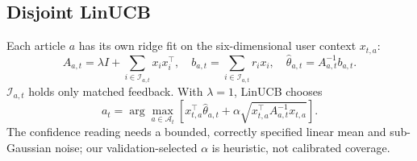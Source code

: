 \documentclass[10pt,a4paper]{article}
\begin{document}
\subsection{Disjoint LinUCB}
Each article $a$ has its own ridge fit on the six-dimensional user context
$x_{t,a}$:
\begin{equation}
A_{a,t}=\lambda I+\sum_{i\in\mathcal I_{a,t}}x_ix_i^\top,\quad
b_{a,t}=\sum_{i\in\mathcal I_{a,t}}r_ix_i,\quad
\hat\theta_{a,t}=A_{a,t}^{-1}b_{a,t}.
\label{eq:ridge}
\end{equation}
$\mathcal I_{a,t}$ holds only matched feedback. With $\lambda=1$, LinUCB chooses
\begin{equation}
a_t=\arg\max_{a\in\mathcal A_t}
\left[x_{t,a}^\top\hat\theta_{a,t}
+\alpha\sqrt{x_{t,a}^\top A_{a,t}^{-1}x_{t,a}}\right].
\label{eq:ucb}
\end{equation}
The confidence reading needs a bounded, correctly specified linear mean
and sub-Gaussian noise; our validation-selected $\alpha$ is heuristic,
not calibrated coverage.
\end{document}
